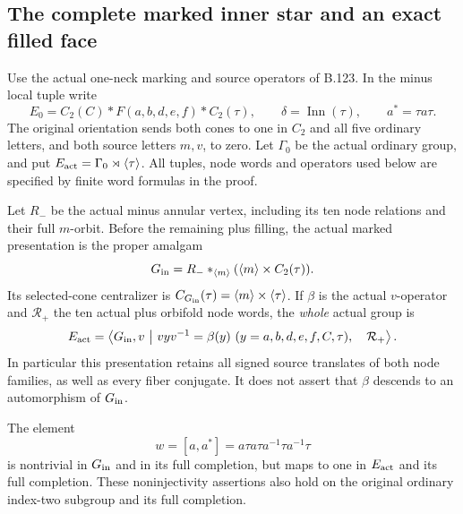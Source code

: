 \subsection*{The complete marked inner star and an exact filled face}

\label{stmt:B135}
Use the actual one-neck marking and source operators of B.123.
In the minus local tuple write
\[
 E_0=C_2(C)*F(a,b,d,e,f)*C_2(\tau),\qquad
 \delta=\operatorname{Inn}(\tau),\qquad a^*=\tau a\tau.
\]
The original orientation sends both cones to one in $C_2$ and
all five ordinary letters, and both source letters $m,v$, to zero.
Let $\Gamma_0$ be the actual ordinary group, and put
$E_{\rm act}=\Gamma_0\rtimes\langle\tau\rangle$.
All tuples, node words and operators used below are specified by
finite word formulas in the proof.

Let $R_-$ be the actual minus annular vertex, including its ten
node relations and their full $m$-orbit. Before the remaining
plus filling, the actual marked presentation is the proper amalgam
\begin{equation}\label{eq:B135-inner-star}
 G_{\rm in}=R_-*_{\langle m\rangle}
                  (\langle m\rangle\times C_2(\tau)).
\end{equation}
Its selected-cone centralizer is
$C_{G_{\rm in}}(\tau)=\langle m\rangle\times\langle\tau\rangle$.
If $\beta$ is the actual $v$-operator and $\mathcal R_+$ the ten
actual plus orbifold node words, the \emph{whole} actual group is
\begin{equation}\label{eq:B135-whole-relative}
 E_{\rm act}=
 \left\langle G_{\rm in},v\ \middle|\
 v yv^{-1}=\beta(y)\ (y=a,b,d,e,f,C,\tau),\quad
 \mathcal R_+\right\rangle .
\end{equation}
In particular this presentation retains all signed source translates
of both node families, as well as every fiber conjugate.
It does not assert that $\beta$ descends to an automorphism of
$G_{\rm in}$.

The element
\begin{equation}\label{eq:B135-killed-word}
 w=[a,a^*]=a\tau a\tau a^{-1}\tau a^{-1}\tau
\end{equation}
is nontrivial in $G_{\rm in}$ and in its full completion, but
maps to one in $E_{\rm act}$ and its full completion. These
noninjectivity assertions also hold on the original ordinary
index-two subgroup and its full completion.

